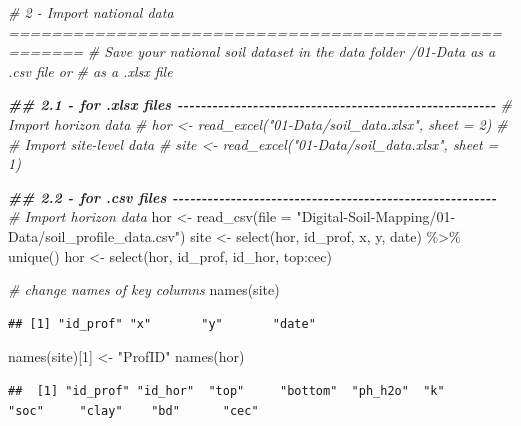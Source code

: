 \documentclass[
  10pt,
  b5paper,
  oneside]{book}
\newenvironment{Shaded}{\begin{snugshade}}{\end{snugshade}}
\newcommand{\AttributeTok}[1]{\textcolor[rgb]{0.77,0.63,0.00}{#1}}
\newcommand{\CommentTok}[1]{\textcolor[rgb]{0.56,0.35,0.01}{\textit{#1}}}
\newcommand{\DecValTok}[1]{\textcolor[rgb]{0.00,0.00,0.81}{#1}}
\newcommand{\DocumentationTok}[1]{\textcolor[rgb]{0.56,0.35,0.01}{\textbf{\textit{#1}}}}
\newcommand{\FunctionTok}[1]{\textcolor[rgb]{0.00,0.00,0.00}{#1}}
\newcommand{\NormalTok}[1]{#1}
\newcommand{\OtherTok}[1]{\textcolor[rgb]{0.56,0.35,0.01}{#1}}
\newcommand{\SpecialCharTok}[1]{\textcolor[rgb]{0.00,0.00,0.00}{#1}}
\newcommand{\StringTok}[1]{\textcolor[rgb]{0.31,0.60,0.02}{#1}}
\begin{document}
\begin{Shaded}
\begin{Highlighting}[]
\CommentTok{\# 2 {-} Import national data =====================================================}
\CommentTok{\# Save your national soil dataset in the data folder /01{-}Data as a .csv file or }
\CommentTok{\# as a .xlsx file}

\DocumentationTok{\#\# 2.1 {-} for .xlsx files {-}{-}{-}{-}{-}{-}{-}{-}{-}{-}{-}{-}{-}{-}{-}{-}{-}{-}{-}{-}{-}{-}{-}{-}{-}{-}{-}{-}{-}{-}{-}{-}{-}{-}{-}{-}{-}{-}{-}{-}{-}{-}{-}{-}{-}{-}{-}{-}{-}{-}{-}{-}{-}{-}{-}}
\CommentTok{\# Import horizon data }
\CommentTok{\# hor \textless{}{-} read\_excel("01{-}Data/soil\_data.xlsx", sheet = 2)}
\CommentTok{\# \# Import site{-}level data}
\CommentTok{\# site \textless{}{-} read\_excel("01{-}Data/soil\_data.xlsx", sheet = 1)}

\DocumentationTok{\#\# 2.2 {-} for .csv files {-}{-}{-}{-}{-}{-}{-}{-}{-}{-}{-}{-}{-}{-}{-}{-}{-}{-}{-}{-}{-}{-}{-}{-}{-}{-}{-}{-}{-}{-}{-}{-}{-}{-}{-}{-}{-}{-}{-}{-}{-}{-}{-}{-}{-}{-}{-}{-}{-}{-}{-}{-}{-}{-}{-}{-}}
\CommentTok{\# Import horizon data }
\NormalTok{hor }\OtherTok{\textless{}{-}} \FunctionTok{read\_csv}\NormalTok{(}\AttributeTok{file =} \StringTok{"Digital{-}Soil{-}Mapping/01{-}Data/soil\_profile\_data.csv"}\NormalTok{)}
\NormalTok{site }\OtherTok{\textless{}{-}} \FunctionTok{select}\NormalTok{(hor, id\_prof, x, y, date) }\SpecialCharTok{\%\textgreater{}\%} \FunctionTok{unique}\NormalTok{()}
\NormalTok{hor }\OtherTok{\textless{}{-}} \FunctionTok{select}\NormalTok{(hor, id\_prof, id\_hor, top}\SpecialCharTok{:}\NormalTok{cec)}

\CommentTok{\# change names of key columns}
\FunctionTok{names}\NormalTok{(site)}
\end{Highlighting}
\end{Shaded}

\begin{verbatim}
## [1] "id_prof" "x"       "y"       "date"
\end{verbatim}

\begin{Shaded}
\begin{Highlighting}[]
\FunctionTok{names}\NormalTok{(site)[}\DecValTok{1}\NormalTok{] }\OtherTok{\textless{}{-}} \StringTok{"ProfID"}
\FunctionTok{names}\NormalTok{(hor)}
\end{Highlighting}
\end{Shaded}

\begin{verbatim}
##  [1] "id_prof" "id_hor"  "top"     "bottom"  "ph_h2o"  "k"       "soc"     "clay"    "bd"      "cec"
\end{verbatim}
\end{document}
